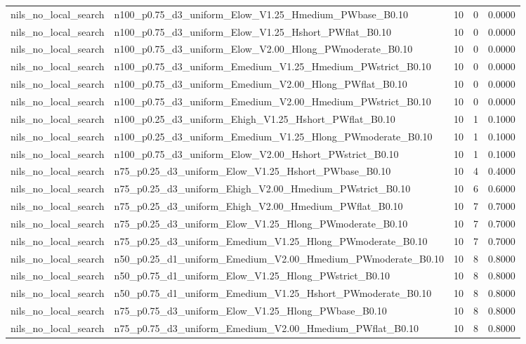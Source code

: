 \begin{tabular}{llrrr}
nils_no_local_search & n100_p0.75_d3_uniform_Elow_V1.25_Hmedium_PWbase_B0.10 & 10 & 0 & 0.0000 \\
nils_no_local_search & n100_p0.75_d3_uniform_Elow_V1.25_Hshort_PWflat_B0.10 & 10 & 0 & 0.0000 \\
nils_no_local_search & n100_p0.75_d3_uniform_Elow_V2.00_Hlong_PWmoderate_B0.10 & 10 & 0 & 0.0000 \\
nils_no_local_search & n100_p0.75_d3_uniform_Emedium_V1.25_Hmedium_PWstrict_B0.10 & 10 & 0 & 0.0000 \\
nils_no_local_search & n100_p0.75_d3_uniform_Emedium_V2.00_Hlong_PWflat_B0.10 & 10 & 0 & 0.0000 \\
nils_no_local_search & n100_p0.75_d3_uniform_Emedium_V2.00_Hmedium_PWstrict_B0.10 & 10 & 0 & 0.0000 \\
nils_no_local_search & n100_p0.25_d3_uniform_Ehigh_V1.25_Hshort_PWflat_B0.10 & 10 & 1 & 0.1000 \\
nils_no_local_search & n100_p0.25_d3_uniform_Emedium_V1.25_Hlong_PWmoderate_B0.10 & 10 & 1 & 0.1000 \\
nils_no_local_search & n100_p0.75_d3_uniform_Elow_V2.00_Hshort_PWstrict_B0.10 & 10 & 1 & 0.1000 \\
nils_no_local_search & n75_p0.25_d3_uniform_Elow_V1.25_Hshort_PWbase_B0.10 & 10 & 4 & 0.4000 \\
nils_no_local_search & n75_p0.25_d3_uniform_Ehigh_V2.00_Hmedium_PWstrict_B0.10 & 10 & 6 & 0.6000 \\
nils_no_local_search & n75_p0.25_d3_uniform_Ehigh_V2.00_Hmedium_PWflat_B0.10 & 10 & 7 & 0.7000 \\
nils_no_local_search & n75_p0.25_d3_uniform_Elow_V1.25_Hlong_PWmoderate_B0.10 & 10 & 7 & 0.7000 \\
nils_no_local_search & n75_p0.25_d3_uniform_Emedium_V1.25_Hlong_PWmoderate_B0.10 & 10 & 7 & 0.7000 \\
nils_no_local_search & n50_p0.25_d1_uniform_Emedium_V2.00_Hmedium_PWmoderate_B0.10 & 10 & 8 & 0.8000 \\
nils_no_local_search & n50_p0.75_d1_uniform_Elow_V1.25_Hlong_PWstrict_B0.10 & 10 & 8 & 0.8000 \\
nils_no_local_search & n50_p0.75_d1_uniform_Emedium_V1.25_Hshort_PWmoderate_B0.10 & 10 & 8 & 0.8000 \\
nils_no_local_search & n75_p0.75_d3_uniform_Elow_V1.25_Hlong_PWbase_B0.10 & 10 & 8 & 0.8000 \\
nils_no_local_search & n75_p0.75_d3_uniform_Emedium_V2.00_Hmedium_PWflat_B0.10 & 10 & 8 & 0.8000 \\

\end{tabular}
